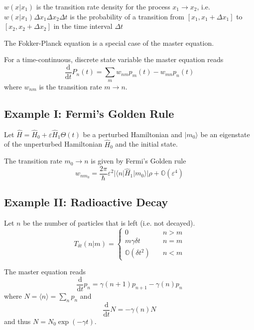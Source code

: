 \documentclass{notebook}
\begin{document}
$w(x|x_1)$ is the transition rate density for the process $x_1 \to x_2$, i.e. $w(x|x_1) \Delta x_1 \Delta x_2 \Delta t$ is the probability of a transition from $[x_1, x_1 + \Delta x_1]$ to $[x_2, x_2 + \Delta x_2]$ in the time interval $\Delta t$

The Fokker-Planck equation is a special case of the master equation. 

For a time-continuous, discrete state variable the master equation reads 
%
\begin{equation}
	\frac{\mathrm{d}}{\mathrm{d}t} P_n(t) = \sum_m w_{nm} p_m(t) - w_{mn} p_n(t)
\end{equation}
%
where $w_{nm}$ is the transition rate $m \to n$. 


\subsection*{Example I: Fermi's Golden Rule}

Let $\hat{H} = \hat{H}_0 + \varepsilon \hat{H}_1 \Theta(t)$ be a perturbed Hamiltonian and $| m_0 \rangle$ be an eigenstate of the unperturbed Hamiltonian $\hat{H}_0$ and the initial state.

The transition rate $m_0 \to n$ is given by Fermi's Golden rule
%
\begin{equation}
	w_{nm_0} = \frac{2\pi}{\hbar} \varepsilon^2 |\langle n | \hat{H}_1 | m_0 \rangle| \rho + \mathbb{O}(\varepsilon^4)
\end{equation}
%


\subsection*{Example II: Radioactive Decay}

Let $n$ be the number of particles that is left (i.e. not decayed). 
%
\begin{equation}
	T_{\delta t}(n|m) = 
	\begin{cases} 
		0 								&\quad n > m \\
		m \gamma \delta t 	&\quad n = m \\
		\mathbb{O}(\delta t^2) &\quad n < m
	\end{cases}
\end{equation}
%


The master equation reads 
%
\begin{equation}
	\frac{\mathrm{d}}{\mathrm{d}t} p_n = \gamma(n+1) p_{n+1} - \gamma(n) p_n
\end{equation}
%
where $N = \langle n \rangle = \sum_n p_n$ and
%
\begin{equation}
	\frac{\mathrm{d}}{\mathrm{d}t} N = - \gamma(n) N
\end{equation}
%
and thus $N = N_0 \exp(-\gamma t)$.
\end{document}
